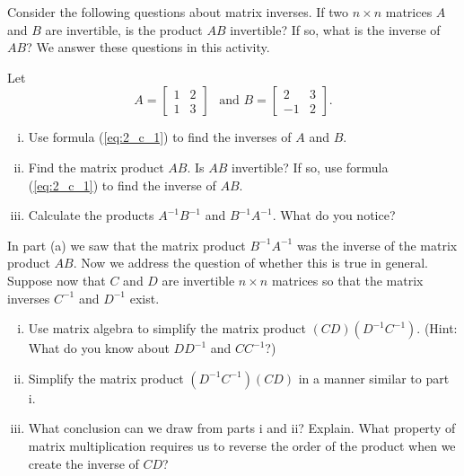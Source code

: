 \begin{activity} \label{act:2_c_5} Consider the following questions about matrix inverses. If two $n \times n$ matrices $A$ and $B$ are invertible, is the product $AB$ invertible? If so, what is the inverse of $AB$? We answer these questions in this activity.
\ba
\item Let 
\[A = \left[ \begin{array}{cc} 1&2\\1&3 \end{array} \right] \ \ \text{ and }  B = \left[ \begin{array}{rc} 2&3\\-1&2 \end{array} \right].\]
	\begin{enumerate}[i.]
	\item Use formula (\ref{eq:2_c_1}) to find the inverses of $A$ and $B$.



	\item Find the matrix product $AB$. Is $AB$ invertible? If so, use formula (\ref{eq:2_c_1}) to find the inverse of $AB$.



	\item Calculate the products $A^{-1}B^{-1}$ and $B^{-1}A^{-1}$. What do you notice?   



	\end{enumerate}

\item In part (a) we saw that the matrix product $B^{-1}A^{-1}$ was the inverse of the matrix product $AB$. Now we address the question of whether this is true in general.  Suppose now that $C$ and $D$ are invertible $n \times n$ matrices so that the matrix inverses $C^{-1}$ and $D^{-1}$ exist. 
	\begin{enumerate}[i.]
	\item Use matrix algebra to simplify the matrix product $(CD)\left(D^{-1}C^{-1}\right)$. (Hint: What do you know about $DD^{-1}$ and $CC^{-1}$?)



	\item Simplify the matrix product $\left(D^{-1}C^{-1}\right)(CD)$ in a manner similar to part i.  
	
	
	
	\item What conclusion can we draw from parts i and ii? Explain. What property of matrix multiplication requires us to reverse the order of the product when we create the inverse of $CD$?  
	
	
	
	\end{enumerate}

\ea

\end{activity} 



